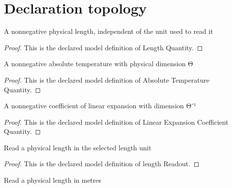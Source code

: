 \section{Declaration topology}
\begin{definition}
  \label{def:physics:phyx-mini-0483:phyxminiproblems-problemphyxmini0483-lengthquantity}
  A nonnegative physical length, independent of the unit used to read it
\end{definition}
\begin{proof}
  This is the declared model definition of Length Quantity.
\end{proof}
\begin{definition}
  \label{def:physics:phyx-mini-0483:phyxminiproblems-problemphyxmini0483-absolutetemperaturequantity}
  A nonnegative absolute temperature with physical dimension Θ
\end{definition}
\begin{proof}
  This is the declared model definition of Absolute Temperature Quantity.
\end{proof}
\begin{definition}
  \label{def:physics:phyx-mini-0483:phyxminiproblems-problemphyxmini0483-linearexpansioncoefficientquantity}
  A nonnegative coefficient of linear expansion with dimension Θ⁻¹
\end{definition}
\begin{proof}
  This is the declared model definition of Linear Expansion Coefficient Quantity.
\end{proof}
\begin{definition}
  \label{def:physics:phyx-mini-0483:phyxminiproblems-problemphyxmini0483-lengthreadout}
  Read a physical length in the selected length unit
\end{definition}
\begin{proof}
  This is the declared model definition of length Readout.
\end{proof}
\begin{definition}
  \label{def:physics:phyx-mini-0483:phyxminiproblems-problemphyxmini0483-lengthinmeters}
  Read a physical length in metres
\end{definition}
